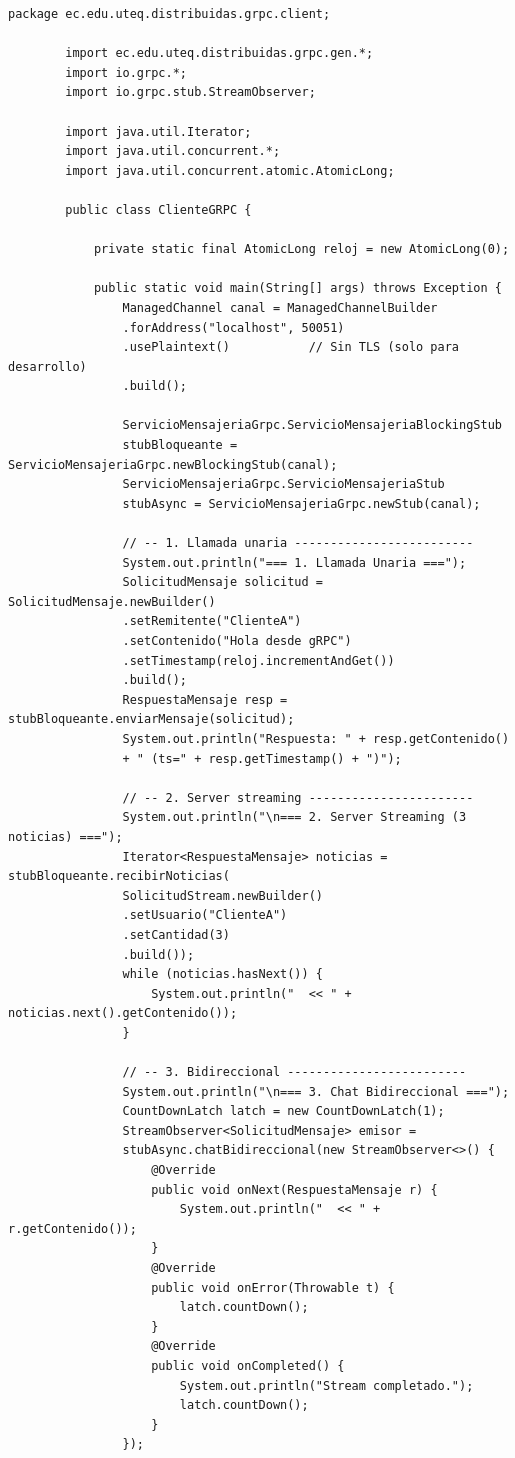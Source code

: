 \documentclass[12pt, a4paper, openany]{book}
\begin{document}
	\begin{lstlisting}[style=JavaStyle, caption={ClienteGRPC.java --- Cliente que demuestra los tres tipos de llamada}]
		package ec.edu.uteq.distribuidas.grpc.client;
		
		import ec.edu.uteq.distribuidas.grpc.gen.*;
		import io.grpc.*;
		import io.grpc.stub.StreamObserver;
		
		import java.util.Iterator;
		import java.util.concurrent.*;
		import java.util.concurrent.atomic.AtomicLong;
		
		public class ClienteGRPC {
			
			private static final AtomicLong reloj = new AtomicLong(0);
			
			public static void main(String[] args) throws Exception {
				ManagedChannel canal = ManagedChannelBuilder
				.forAddress("localhost", 50051)
				.usePlaintext()           // Sin TLS (solo para desarrollo)
				.build();
				
				ServicioMensajeriaGrpc.ServicioMensajeriaBlockingStub
				stubBloqueante = ServicioMensajeriaGrpc.newBlockingStub(canal);
				ServicioMensajeriaGrpc.ServicioMensajeriaStub
				stubAsync = ServicioMensajeriaGrpc.newStub(canal);
				
				// -- 1. Llamada unaria -------------------------
				System.out.println("=== 1. Llamada Unaria ===");
				SolicitudMensaje solicitud = SolicitudMensaje.newBuilder()
				.setRemitente("ClienteA")
				.setContenido("Hola desde gRPC")
				.setTimestamp(reloj.incrementAndGet())
				.build();
				RespuestaMensaje resp = stubBloqueante.enviarMensaje(solicitud);
				System.out.println("Respuesta: " + resp.getContenido()
				+ " (ts=" + resp.getTimestamp() + ")");
				
				// -- 2. Server streaming -----------------------
				System.out.println("\n=== 2. Server Streaming (3 noticias) ===");
				Iterator<RespuestaMensaje> noticias = stubBloqueante.recibirNoticias(
				SolicitudStream.newBuilder()
				.setUsuario("ClienteA")
				.setCantidad(3)
				.build());
				while (noticias.hasNext()) {
					System.out.println("  << " + noticias.next().getContenido());
				}
				
				// -- 3. Bidireccional -------------------------
				System.out.println("\n=== 3. Chat Bidireccional ===");
				CountDownLatch latch = new CountDownLatch(1);
				StreamObserver<SolicitudMensaje> emisor =
				stubAsync.chatBidireccional(new StreamObserver<>() {
					@Override
					public void onNext(RespuestaMensaje r) {
						System.out.println("  << " + r.getContenido());
					}
					@Override
					public void onError(Throwable t) {
						latch.countDown();
					}
					@Override
					public void onCompleted() {
						System.out.println("Stream completado.");
						latch.countDown();
					}
				});
				

\end{lstlisting}
\end{document}

